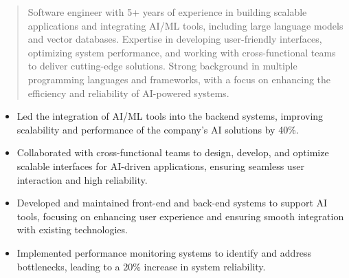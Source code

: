 



\makecvheader

\begin{quote}
  \noindent
  Software engineer with 5+ years of experience in building scalable applications and integrating AI/ML tools, including large language models and vector databases. Expertise in developing user-friendly interfaces, optimizing system performance, and working with cross-functional teams to deliver cutting-edge solutions. Strong background in multiple programming languages and frameworks, with a focus on enhancing the efficiency and reliability of AI-powered systems.
\end{quote}

\par\smallskip
\noindent
\begin{minipage}{20cm}
  \begin{minipage}{9.75cm}
    \begin{itemize}
      \item Led the integration of AI/ML tools into the backend systems, improving scalability and performance of the company’s AI solutions by 40\%.
      \item Collaborated with cross-functional teams to design, develop, and optimize scalable interfaces for AI-driven applications, ensuring seamless user interaction and high reliability.
    \end{itemize}
  \end{minipage}
  \hfill
  \begin{minipage}{9.75cm}
    \begin{itemize}
      \item Developed and maintained front-end and back-end systems to support AI tools, focusing on enhancing user experience and ensuring smooth integration with existing technologies.
      \item Implemented performance monitoring systems to identify and address bottlenecks, leading to a 20\% increase in system reliability.
    \end{itemize}
  \end{minipage}
\end{minipage}
\par


